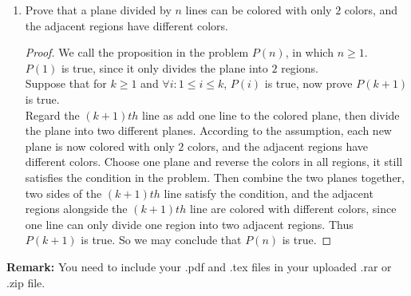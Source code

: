\documentclass[12pt,a4paper,UTF8]{article}
\theoremstyle{definition}
\begin{document}
\begin{enumerate}
    \item
    Prove that a plane divided by $n$ lines can be colored with only $2$ colors, and the adjacent regions have different colors.
    \begin{proof}
        We call the proposition in the problem $ P(n) $, in which $ n \geq 1 $.\\
        $ P(1) $ is true, since it only divides the plane into $ 2 $ regions.\\
        Suppose that for $ k \geq 1 $ and $ {\forall}i: 1 \leq i \leq k $, $ P(i) $ is true, now prove $ P(k+1) $ is true.\\
        Regard the $ (k+1)th $ line as add one line to the colored plane, then divide the plane into two different planes. According to the assumption, each new plane is now colored with only $ 2 $ colors, and the adjacent regions have different colors. Choose one plane and reverse the colors in all regions, it still satisfies the condition in the problem. Then combine the two planes together, two sides of the $ (k+1)th $ line satisfy the condition, and the adjacent regions alongside the $ (k+1)th $ line are colored with different colors, since one line can only divide one region into two adjacent regions. Thus $ P(k+1) $ is true. So we may conclude that $ P(n) $ is true.
    \end{proof}

\end{enumerate}

\vspace{20pt}

\textbf{Remark:} You need to include your .pdf and .tex files in your uploaded .rar or .zip file.

\end{document}

